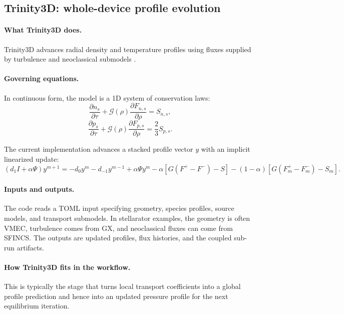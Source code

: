 \documentclass[11pt]{article}
\begin{document}
\subsection{Trinity3D: whole-device profile evolution}

\paragraph{What Trinity3D does.}
Trinity3D advances radial density and temperature profiles using fluxes supplied
by turbulence and neoclassical submodels \citep{TrinityDocs}.

\paragraph{Governing equations.}
In continuous form, the model is a 1D system of conservation laws:
\begin{equation}
\frac{\partial n_s}{\partial \tau}
+
\mathcal{G}(\rho)\frac{\partial F_{n,s}}{\partial \rho}
=
S_{n,s},
\end{equation}
\begin{equation}
\frac{\partial p_s}{\partial \tau}
+
\mathcal{G}(\rho)\frac{\partial F_{p,s}}{\partial \rho}
=
\frac{2}{3}S_{p,s}.
\end{equation}

The current implementation advances a stacked profile vector $y$ with an
implicit linearized update:
\begin{equation}
\left(d_1 I + \alpha\Psi\right)y^{m+1}
=
-d_0 y^m - d_{-1}y^{m-1}
+
\alpha\Psi y^m
-
\alpha\left[G(F^+ - F^-) - S\right]
-
(1-\alpha)\left[G(F^+_m - F^-_m) - S_m\right].
\end{equation}

\paragraph{Inputs and outputs.}
The code reads a TOML input specifying geometry, species profiles, source
models, and transport submodels. In stellarator examples, the geometry is often
VMEC, turbulence comes from GX, and neoclassical fluxes can come from SFINCS.
The outputs are updated profiles, flux histories, and the coupled sub-run
artifacts.

\paragraph{How Trinity3D fits in the workflow.}
This is typically the stage that turns local transport coefficients into a
global profile prediction and hence into an updated pressure profile for the
next equilibrium iteration.
\end{document}
